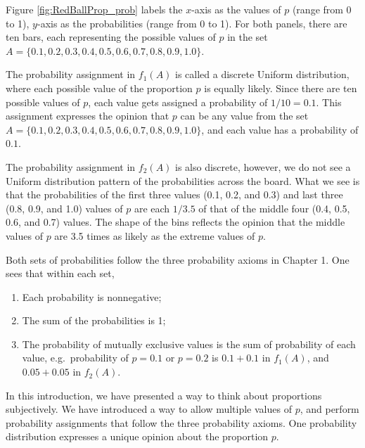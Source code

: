 \documentclass[]{book}
\begin{document}
Figure \ref{fig:RedBallProp_prob} labels the \(x\)-axis as the values of \(p\) (range from 0 to 1), \(y\)-axis as the probabilities (range from 0 to 1). For both panels, there are ten bars, each representing the possible values of \(p\) in the set \(A = \{0.1, 0.2, 0.3, 0.4, 0.5, 0.6, 0.7, 0.8, 0.9, 1.0\}\).

The probability assignment in \(f_1(A)\) is called a discrete Uniform distribution, where each possible value of the proportion \(p\) is equally likely. Since there are ten possible values of \(p\), each value gets assigned a probability of \(1/10 = 0.1\). This assignment expresses the opinion that \(p\) can be any value from the set \(A = \{0.1, 0.2, 0.3, 0.4, 0.5, 0.6, 0.7, 0.8, 0.9, 1.0\}\), and each value has a probability of \(0.1\).

The probability assignment in \(f_2(A)\) is also discrete, however, we do not see a Uniform distribution pattern of the probabilities across the board. What we see is that the probabilities of the first three values (0.1, 0.2, and 0.3) and last three (0.8, 0.9, and 1.0) values of \(p\) are each \(1/3.5\) of that of the middle four (0.4, 0.5, 0.6, and 0.7) values. The shape of the bins reflects the opinion that the middle values of \(p\) are 3.5 times as likely as the extreme values of \(p\).

Both sets of probabilities follow the three probability axioms in Chapter 1. One sees that within each set,

\begin{enumerate}
\def\labelenumi{\arabic{enumi}.}
\item
  Each probability is nonnegative;
\item
  The sum of the probabilities is 1;
\item
  The probability of mutually exclusive values is the sum of probability of each value, e.g.~probability of \(p = 0.1\) or \(p = 0.2\) is \(0.1 + 0.1\) in \(f_1(A)\), and \(0.05 + 0.05\) in \(f_2(A)\).
\end{enumerate}

In this introduction, we have presented a way to think about proportions subjectively. We have introduced a way to allow multiple values of \(p\), and perform probability assignments that follow the three probability axioms. One probability distribution expresses a unique opinion about the proportion \(p\).
\end{document}
